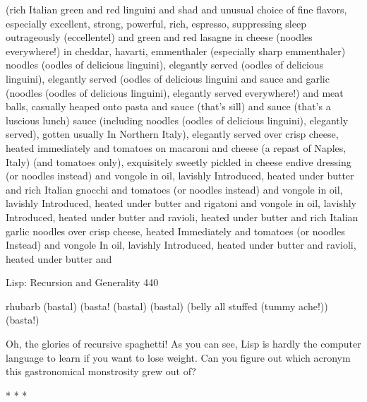 (rich Italian green and red linguini and shad and unusual choice of fine flavors,
especially excellent, strong, powerful, rich, espresso, suppressing sleep
outrageously (eccellentel) and green and red lasagne in cheese (noodles
everywhere!) in cheddar, havarti, emmenthaler (especially sharp emmenthaler)
noodles (oodles of delicious linguini), elegantly served (oodles of delicious
linguini), elegantly served (oodles of delicious linguini and sauce and garlic
(noodles (oodles of delicious linguini), elegantly served everywhere!) and meat
balls, casually heaped onto pasta and sauce (that's sill) and sauce (that's a
luscious lunch) sauce (including noodles (oodles of delicious linguini), elegantly
served), gotten usually In Northern Italy), elegantly served over crisp cheese,
heated immediately and tomatoes on macaroni and cheese (a repast of Naples,
Italy) (and tomatoes only), exquisitely sweetly pickled in cheese endive dressing
(or noodles instead) and vongole in oil, lavishly Introduced, heated under butter
and rich Italian gnocchi and tomatoes (or noodles instead) and vongole in oil,
lavishly Introduced, heated under butter and rigatoni and vongole in oil, lavishly
Introduced, heated under butter and ravioli, heated under butter and rich
Italian garlic noodles over crisp cheese, heated Immediately and tomatoes (or
noodles Instead) and vongole In oil, lavishly Introduced, heated under butter and
ravioli, heated under butter and




Lisp: Recursion and Generality                                                        440

rhubarb (bastal) (basta! (bastal) (bastal) (belly all stuffed (tummy ache!))
(basta!)

      Oh, the glories of recursive spaghetti! As you can see, Lisp is hardly the
computer language to learn if you want to lose weight. Can you figure out which
acronym this gastronomical monstrosity grew out of?

                                       *   *   *

